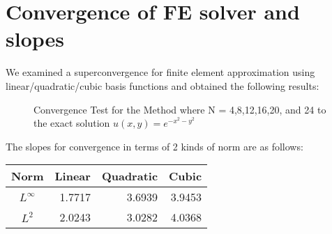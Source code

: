 \documentclass[11pt, notitlepage,  letterpaper]{article}
\begin{document}
%
\author{Seungkeol\ Choe \\ skchoe@cs.utah.edu}

\renewcommand{\today}{Apr 30th, 2004}





\section{Convergence of FE solver and slopes}

\medskip %
\renewcommand{\arraystretch}{1.5}

We examined a superconvergence for finite element approximation using linear/quadratic/cubic basis functions and obtained the following results:

\begin{figure}[h]
    \begin{center}
    \caption{\label{scrvsol1}Convergence Test for the Method where N = 4,8,12,16,20, and 24 to the exact solution $u(x,y) = e^{- x^2 - y^2}$}
    \end{center}
\end{figure}

The slopes for convergence in terms of 2 kinds of norm are as follows:

\begin{center}
\begin{tabular}{|c||r|r|r|}  \hline
Norm  & Linear & Quadratic & Cubic\\ \hline \hline
$L^{\infty}$&1.7717&3.6939&3.9453 \\\hline
$L^2$&2.0243&3.0282&4.0368\\\hline
\end{tabular}
\end{center}
\end{document}
